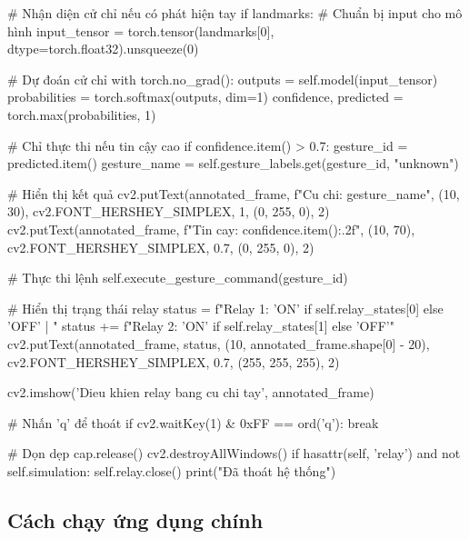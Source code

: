 \begin{aivncodebox}
\begin{python}
            # Nhận diện cử chỉ nếu có phát hiện tay
            if landmarks:
                # Chuẩn bị input cho mô hình
                input_tensor = torch.tensor(landmarks[0], dtype=torch.float32).unsqueeze(0)
                
                # Dự đoán cử chỉ
                with torch.no_grad():
                    outputs = self.model(input_tensor)
                    probabilities = torch.softmax(outputs, dim=1)
                    confidence, predicted = torch.max(probabilities, 1)
                    
                    # Chỉ thực thi nếu tin cậy cao
                    if confidence.item() > 0.7:
                        gesture_id = predicted.item()
                        gesture_name = self.gesture_labels.get(gesture_id, "unknown")
                        
                        # Hiển thị kết quả
                        cv2.putText(annotated_frame, f"Cu chi: {gesture_name}", 
                                   (10, 30), cv2.FONT_HERSHEY_SIMPLEX, 1, (0, 255, 0), 2)
                        cv2.putText(annotated_frame, f"Tin cay: {confidence.item():.2f}", 
                                   (10, 70), cv2.FONT_HERSHEY_SIMPLEX, 0.7, (0, 255, 0), 2)
                        
                        # Thực thi lệnh
                        self.execute_gesture_command(gesture_id)
            
            # Hiển thị trạng thái relay
            status = f"Relay 1: {'ON' if self.relay_states[0] else 'OFF'} | "
            status += f"Relay 2: {'ON' if self.relay_states[1] else 'OFF'}"
            cv2.putText(annotated_frame, status, 
                       (10, annotated_frame.shape[0] - 20),
                       cv2.FONT_HERSHEY_SIMPLEX, 0.7, (255, 255, 255), 2)
            
            cv2.imshow('Dieu khien relay bang cu chi tay', annotated_frame)
            
            # Nhấn 'q' để thoát
            if cv2.waitKey(1) & 0xFF == ord('q'):
                break
        
        # Dọn dẹp
        cap.release()
        cv2.destroyAllWindows()
        if hasattr(self, 'relay') and not self.simulation:
            self.relay.close()
        print("Đã thoát hệ thống")
\end{python}
\end{aivncodebox}

\subsection{Cách chạy ứng dụng chính}

